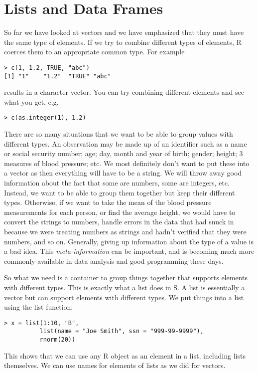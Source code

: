  
\section{Lists and Data Frames}
So far we have looked at vectors and we have emphasized that they must
have the same type of elements. If we try to combine different types
of elements, R coerces them to an appropriate common type. For example
\begin{verbatim}
> c(1, 1.2, TRUE, "abc")
[1] "1"    "1.2"  "TRUE" "abc" 
\end{verbatim}
results in a character vector. You can try combining different
elements and see what you get, e.g.
\begin{verbatim}
> c(as.integer(1), 1.2)
\end{verbatim}


There are so many situations that we want to be able to group values
with different types. An observation may be made up of an identifier
such as a name or social security number; age; day, month and year of
birth; gender; height; 3 measures of blood pressure; etc. We most
definitely don't want to put these into a vector as then everything
will have to be a string. We will throw away good information about
the fact that some are numbers, some are integers, etc. Instead, we
want to be able to group them together but keep their different
types. Otherwise, if we want to take the mean of the blood pressure
measurements for each person, or find the average height, we would
have to convert the strings to numbers, handle errors in the data that
had snuck in because we were treating numbers as strings and hadn't
verified that they were numbers, and so on. Generally, giving up
information about the type of a value is a bad idea. This
{\em{meta-information}} can be important, and is becoming much more
commonly available in data analysis and good programming these days.

So what we need is a container to group things together that supports
elements with different types. This is exactly what a list does in
S. A list is essentially a vector but can support elements with
different types. We put things into a list using the list function:
\begin{verbatim}
> x = list(1:10, "B", 
          list(name = "Joe Smith", ssn = "999-99-9999"), 
          rnorm(20))
\end{verbatim}
This shows that we can use any R object as an element in a list,
including lists themselves. We can use names for elements of lists as
we did for vectors.

